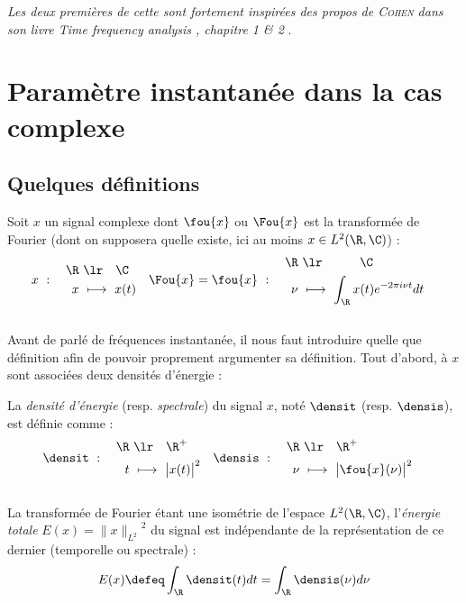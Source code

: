 \textit{Les deux premières  de cette   sont fortement inspirées des propos de \textsc{Cohen} dans son livre \emph{Time frequency analysis} \cite{cohen_time_1995}, chapitre 1 \& 2 }.

\section{Paramètre instantanée dans la cas complexe}\label{sec:temp-freq}


\subsection{Quelques définitions}\label{sec:preli_temp-freq}

Soit $x$ un signal complexe dont $\fou{x}$ ou $\Fou{x}$ est la transformée de Fourier (dont on supposera quelle existe, ici au moins $x\in L^2(\R, \C)$) :
\begin{align*}
	x\ &:\quad \begin{aligned}\R\ &\lr\quad \C \\ x\ &\longmapsto\ x(t)
	\end{aligned}  &  \Fou{x}=\fou{x}\ &:\quad \begin{aligned}\R\ &\lr\qquad\quad \C \\ \nu\ &\longmapsto\ \int_\R x(t)e^{-2\pi i \nu t}dt
	\end{aligned}
\end{align*}
\\
Avant de parlé de fréquences instantanée, il nous faut introduire quelle que définition afin de pouvoir proprement argumenter sa définition.
Tout d'abord, à $x$ sont associées deux densités d'énergie :

\begin{definition}\label{def:densi_dE}
	La \emph{densité d'énergie} (resp. \emph{spectrale}) du signal $x$, noté $\densit$ (resp. $\densis$), est définie comme :
	\begin{align}\label{eq:densi_dE}
		\densit\ &:\quad \begin{aligned}\R\ &\lr\quad \R^+ \\ t\ &\longmapsto\ \big|x(t)\big|^2 \end{aligned}  
		&
		\densis\ &:\quad \begin{aligned}\R\ &\lr\quad \R^+ \\ \nu\ &\longmapsto\ \big|\fou{x}(\nu)\big|^2 \end{aligned}
	\end{align}
	\\
	La transformée de Fourier étant une isométrie de l'espace $L^2(\R,\C)$, l'\emph{énergie totale} $E(x)={\|x\|_{L^2}}^2$ du signal est indépendante de la représentation de ce dernier (temporelle ou spectrale) :
	\begin{equation}\label{eq:parceval}
		E(x) \defeq  \int_\R \densit(t) dt = \int_\R \densis(\nu) d\nu
	\end{equation}
\end{definition}
\skipl

